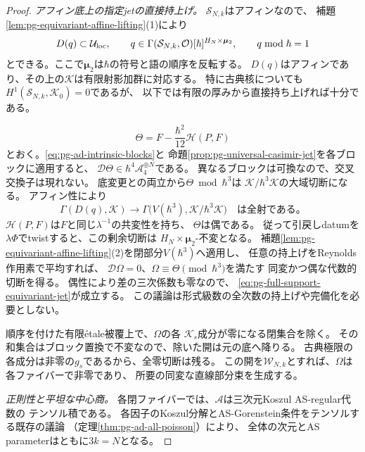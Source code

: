\begin{proof}
\emph{アフィン底上の指定jetの直接持上げ。}
$\mathcal S_{N,k}$はアフィンなので、
補題\ref{lem:pg-equivariant-affine-lifting}(1)により
\begin{equation}
 D(q)\subset\mathcal U_{\mathrm{loc}},\qquad
 q\in\Gamma(\mathcal S_{N,k},\mathcal O)[\hbar]^{H_N\times\boldsymbol\mu_2},
 \qquad q\bmod\hbar=1
 \label{eq:pg-full-support-affine-good-open}
\end{equation}
とできる。ここで$\boldsymbol\mu_2$は$\hbar$の符号と語の順序を反転する。
$D(q)$はアフィンであり、その上の$\mathcal K$は有限射影加群に対応する。
特に古典核についても$H^1(\mathcal S_{N,k},\mathcal K_0)=0$であるが、
以下では有限の厚みから直接持ち上げれば十分である。

\begin{equation}
 \Theta=F-\frac{\hbar^2}{12}\mathscr H(P,F)
 \label{eq:pg-full-support-prescribed-theta}
\end{equation}
とおく。\eqref{eq:pg-ad-intrinsic-blocks}と
命題\ref{prop:pg-universal-casimir-jet}を各ブロックに適用すると、
$\mathcal D\Theta\in\hbar^4\mathcal A_4^{\oplus N}$である。
異なるブロックは可換なので、交叉交換子は現れない。
底変更との両立から$\Theta\bmod\hbar^3$は
$\mathcal K/\hbar^3\mathcal K$の大域切断になる。
アフィン性により
\begin{equation}
 \Gamma(D(q),\mathcal K)\longrightarrow
 \Gamma\bigl(V(\hbar^3),\mathcal K/\hbar^3\mathcal K\bigr)
 \quad\text{は全射である。}
 \label{eq:pg-full-support-jet-lift-surjection}
\end{equation}
$\mathscr H(P,F)$は$F$と同じ$\lambda^{-1}$の共変性を持ち、
$\Theta$は偶である。
従って引戻しdatumを$\lambda\Phi$でtwistすると、この剰余切断は
$H_N\times\boldsymbol\mu_2$-不変となる。
補題\ref{lem:pg-equivariant-affine-lifting}(2)を閉部分$V(\hbar^3)$へ適用し、
任意の持上げをReynolds作用素で平均すれば、
$\mathcal D\Omega=0$、$\Omega\equiv\Theta\pmod{\hbar^3}$を満たす
同変かつ偶な代数的切断を得る。
偶性により差の三次係数も零なので、
\eqref{eq:pg-full-support-equivariant-jet}が成立する。
この議論は形式級数の全次数の持上げや完備化を必要としない。

順序を付けた有限\'{e}tale被覆上で、$\Omega$の各
$\mathcal K_s$成分が零になる閉集合を除く。
その和集合はブロック置換で不変なので、除いた開は元の底へ降りる。
古典極限の各成分は非零の$g_s$であるから、全零切断は残る。
この開を$\mathcal W_{N,k}$とすれば、$\Omega$は各ファイバーで非零であり、
所要の同変な直線部分束を生成する。

\emph{正則性と平坦な中心商。}
各閉ファイバーでは、$\mathcal A$は三次元Koszul AS-regular代数の
テンソル積である。
各因子のKoszul分解とAS-Gorenstein条件をテンソルする既存の議論
（定理\ref{thm:pg-ad-all-poisson}）により、
全体の次元とAS parameterはともに$3k=N$となる。


\end{proof}
